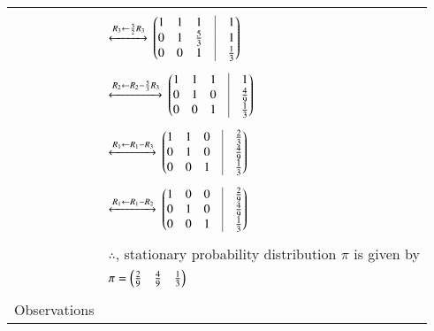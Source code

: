 \documentclass[journal,12pt]{IEEEtran}
\begin{document}
\begin{longtable}{|l|l|}
		&\\
		& \qquad $\xleftrightarrow[]{R_3 \leftarrow \frac{3}{2}R_3}$
		$\myvec{1&1&1&\vrule&1\\0&1&\frac{5}{3}&\vrule&1\\0&0&1&\vrule&\frac{1}{3}}$\\
		&\\
		& \qquad $\xleftrightarrow[]{R_2 \leftarrow R_2 - \frac{5}{3}R_3}$
		$\myvec{1&1&1&\vrule&1\\0&1&0&\vrule&\frac{4}{9}\\0&0&1&\vrule&\frac{1}{3}}$\\
		&\\
		& \qquad $\xleftrightarrow[]{R_1 \leftarrow R_1 - R_3}$
		$\myvec{1&1&0&\vrule&\frac{2}{3}\\0&1&0&\vrule&\frac{4}{9}\\0&0&1&\vrule&\frac{1}{3}}$\\
		&\\
		& \qquad $\xleftrightarrow[]{R_1 \leftarrow R_1 - R_2}$
		$\myvec{1&0&0&\vrule&\frac{2}{9}\\0&1&0&\vrule&\frac{4}{9}\\0&0&1&\vrule&\frac{1}{3}}$\\
		&\\
		& $\therefore$, stationary probability distribution $\pi$ is given by \\
		& \qquad \qquad $\pi = \begin{pmatrix}\frac{2}{9} & \frac{4}{9} & \frac{1}{3}\end{pmatrix}$ \\
		& \\
		\hline
		\multirow{3}{*}{Observations} & \\
		

\end{longtable}
\end{document}
